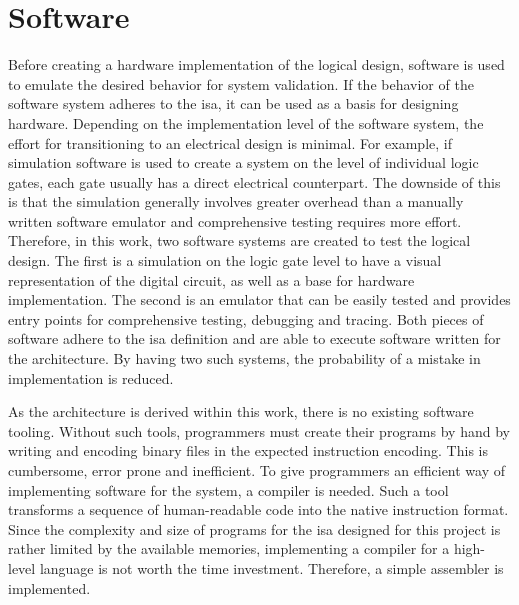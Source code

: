 \section{Software}

Before creating a hardware implementation of the logical design, software is used to emulate the desired behavior for system validation. If the behavior of the software system adheres to the \ac{isa}, it can be used as a basis for designing hardware. Depending on the implementation level of the software system, the effort for transitioning to an electrical design is minimal. For example, if simulation software is used to create a system on the level of individual logic gates, each gate usually has a direct electrical counterpart. The downside of this is that the simulation generally involves greater overhead than a manually written software emulator and comprehensive testing requires more effort. Therefore, in this work, two software systems are created to test the logical design. The first is a simulation on the logic gate level to have a visual representation of the digital circuit, as well as a base for hardware implementation. The second is an emulator that can be easily tested and provides entry points for comprehensive testing, debugging and tracing. Both pieces of software adhere to the \ac{isa} definition and are able to execute software written for the architecture. By having two such systems, the probability of a mistake in implementation is reduced.

As the architecture is derived within this work, there is no existing software tooling. Without such tools, programmers must create their programs by hand by writing and encoding binary files in the expected instruction encoding. This is cumbersome, error prone and inefficient. To give programmers an efficient way of implementing software for the system, a compiler is needed. Such a tool transforms a sequence of human-readable code into the native instruction format. Since the complexity and size of programs for the \ac{isa} designed for this project is rather limited by the available memories, implementing a compiler for a high-level language is not worth the time investment. Therefore, a simple assembler is implemented.




